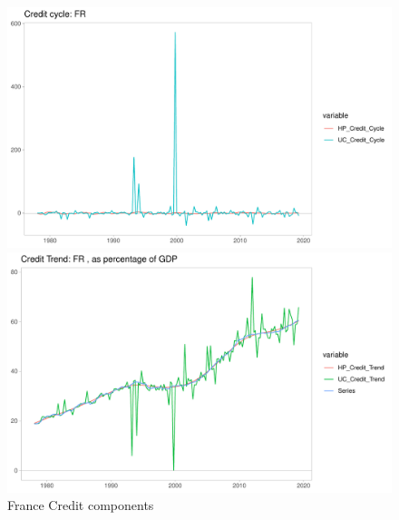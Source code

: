 \documentclass[fleqn]{article}
\begin{document}
\begin{outline}[enumerate]
\begin{figure}[h!]
	\caption{France Credit components}	
	\centerline{\includegraphics[scale=0.7]{../Output/Graphs/Credit_cycle_FR.pdf}}
	\centerline{\includegraphics[scale=0.7]{../Output/Graphs/Credit_trend_FR.pdf}}
\end{figure}


\end{outline}
\end{document}
